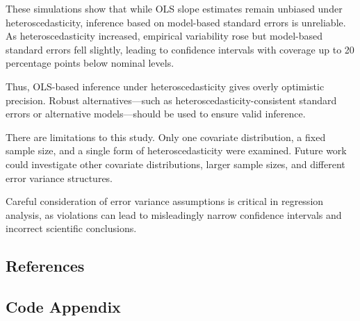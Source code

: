 \documentclass[
  twocolumn]{article}
\begin{document}
These simulations show that while OLS slope estimates remain unbiased under heteroscedasticity, inference based on model-based standard errors is unreliable. As heteroscedasticity increased, empirical variability rose but model-based standard errors fell slightly, leading to confidence intervals with coverage up to 20 percentage points below nominal levels.

Thus, OLS-based inference under heteroscedasticity gives overly optimistic precision. Robust alternatives---such as heteroscedasticity-consistent standard errors or alternative models---should be used to ensure valid inference.

There are limitations to this study. Only one covariate distribution, a fixed sample size, and a single form of heteroscedasticity were examined. Future work could investigate other covariate distributions, larger sample sizes, and different error variance structures.

Careful consideration of error variance assumptions is critical in regression analysis, as violations can lead to misleadingly narrow confidence intervals and incorrect scientific conclusions.

\newpage
\onecolumn

\subsection{References}\label{references}

\vspace{2mm}

\label{refs}

\subsection{Code Appendix}\label{code-appendix}
\end{document}
